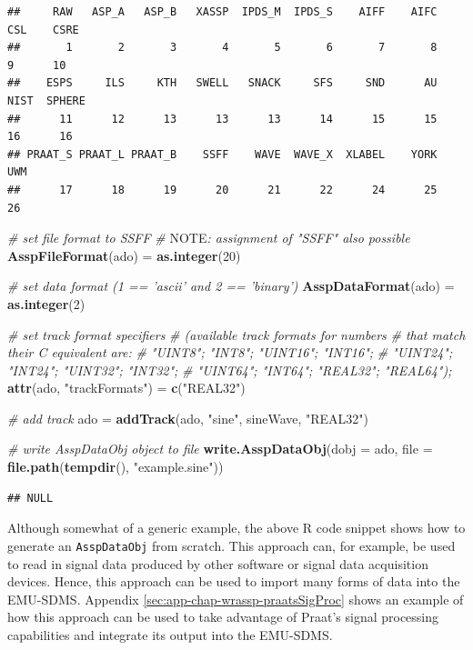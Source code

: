 \documentclass[]{book}
\newenvironment{Shaded}{\begin{snugshade}}{\end{snugshade}}
\newcommand{\AlertTok}[1]{\textcolor[rgb]{0.94,0.16,0.16}{#1}}
\newcommand{\CommentTok}[1]{\textcolor[rgb]{0.56,0.35,0.01}{\textit{#1}}}
\newcommand{\DataTypeTok}[1]{\textcolor[rgb]{0.13,0.29,0.53}{#1}}
\newcommand{\DecValTok}[1]{\textcolor[rgb]{0.00,0.00,0.81}{#1}}
\newcommand{\KeywordTok}[1]{\textcolor[rgb]{0.13,0.29,0.53}{\textbf{#1}}}
\newcommand{\NormalTok}[1]{#1}
\newcommand{\StringTok}[1]{\textcolor[rgb]{0.31,0.60,0.02}{#1}}
\begin{document}
\begin{verbatim}
##     RAW   ASP_A   ASP_B   XASSP  IPDS_M  IPDS_S    AIFF    AIFC     CSL    CSRE 
##       1       2       3       4       5       6       7       8       9      10 
##    ESPS     ILS     KTH   SWELL   SNACK     SFS     SND      AU    NIST  SPHERE 
##      11      12      13      13      13      14      15      15      16      16 
## PRAAT_S PRAAT_L PRAAT_B    SSFF    WAVE  WAVE_X  XLABEL    YORK     UWM 
##      17      18      19      20      21      22      24      25      26
\end{verbatim}

\begin{Shaded}
\begin{Highlighting}[]
\CommentTok{# set file format to SSFF}
\CommentTok{# }\AlertTok{NOTE}\CommentTok{: assignment of "SSFF" also possible}
\KeywordTok{AsspFileFormat}\NormalTok{(ado) =}\StringTok{ }\KeywordTok{as.integer}\NormalTok{(}\DecValTok{20}\NormalTok{)}

\CommentTok{# set data format (1 == 'ascii' and 2 == 'binary')}
\KeywordTok{AsspDataFormat}\NormalTok{(ado) =}\StringTok{ }\KeywordTok{as.integer}\NormalTok{(}\DecValTok{2}\NormalTok{)}

\CommentTok{# set track format specifiers}
\CommentTok{# (available track formats for numbers}
\CommentTok{# that match their C equivalent are:}
\CommentTok{# "UINT8"; "INT8"; "UINT16"; "INT16";}
\CommentTok{# "UINT24"; "INT24"; "UINT32"; "INT32";}
\CommentTok{# "UINT64"; "INT64"; "REAL32"; "REAL64");}
\KeywordTok{attr}\NormalTok{(ado, }\StringTok{"trackFormats"}\NormalTok{) =}\StringTok{ }\KeywordTok{c}\NormalTok{(}\StringTok{"REAL32"}\NormalTok{)}

\CommentTok{# add track}
\NormalTok{ado =}\StringTok{ }\KeywordTok{addTrack}\NormalTok{(ado, }\StringTok{"sine"}\NormalTok{, sineWave, }\StringTok{"REAL32"}\NormalTok{)}

\CommentTok{# write AsspDataObj object to file}
\KeywordTok{write.AsspDataObj}\NormalTok{(}\DataTypeTok{dobj =}\NormalTok{ ado,}
                  \DataTypeTok{file =} \KeywordTok{file.path}\NormalTok{(}\KeywordTok{tempdir}\NormalTok{(), }\StringTok{"example.sine"}\NormalTok{))}
\end{Highlighting}
\end{Shaded}

\begin{verbatim}
## NULL
\end{verbatim}

Although somewhat of a generic example, the above R code snippet shows how to generate an \texttt{AsspDataObj} from scratch. This approach can, for example, be used to read in signal data produced by other software or signal data acquisition devices. Hence, this approach can be used to import many forms of data into the EMU-SDMS. Appendix \ref{sec:app-chap-wrassp-praatsSigProc} shows an example of how this approach can be used to take advantage of Praat's signal processing capabilities and integrate its output into the EMU-SDMS.
\end{document}
